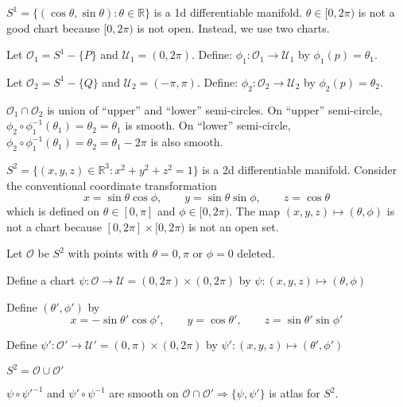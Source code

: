 \documentclass[a4paper,11pt]{article}
\DeclareMathOperator{\cpf}{\circ}
\begin{document}
	\begin{ex}
		$S^1 = \{(\cos \theta, \sin \theta): \theta \in \mathbb{R}\}$ is a 1d differentiable manifold. $\theta\in [0,2\pi)$ is not a good chart because $[0,2\pi)$ is not open. Instead, we use two charts. 
		
		Let $\mathcal{O}_1 = S^1 - \{P\}$ and $\mathcal{U}_1 = (0,2\pi)$. Define: $\phi_1: \mathcal{O}_1 \to \mathcal{U}_1$ by $\phi_1(p) = \theta_1$. 
		
		Let $\mathcal{O}_2 = S^1 - \{Q\}$ and $\mathcal{U}_2 = (-\pi,\pi)$. Define: $\phi_2: \mathcal{O}_2 \to \mathcal{U}_2$ by $\phi_2(p) = \theta_2$. 
		
		$\mathcal{O}_1 \cap \mathcal{O}_2$ is union of ``upper'' and ``lower'' semi-circles. On ``upper'' semi-circle, $\phi_2 \cpf \phi_1^{-1}(\theta_1) = \theta_2 = \theta_1$ is smooth. On ``lower'' semi-circle, $\phi_2 \cpf \phi_1^{-1}(\theta_1) = \theta_2 = \theta_1 - 2\pi$ is also smooth.
	\end{ex}

	\begin{ex}
		$S^2 = \{(x,y,z)\in \mathbb{R}^3 : x^2+y^2+z^2 = 1\}$ is a 2d differentiable manifold. Consider the conventional coordinate transformation $$x = \sin \theta \cos \phi,\qquad y = \sin \theta \sin \phi,\qquad z = \cos\theta$$ which is defined on $\theta \in [0,\pi]$ and $\phi \in [0,2\pi)$. The map $(x,y,z) \mapsto (\theta, \phi)$ is not a chart because $[0,2\pi]\times [0,2\pi)$ is not an open set.
		
		Let $\mathcal{O}$ be $S^2$ with points with $\theta = 0, \pi$ or $\phi = 0$ deleted.

		Define a chart $\psi: \mathcal{O} \to \mathcal{U} = (0,2\pi) \times (0,2\pi)$ by $\psi: (x,y,z) \mapsto (\theta,\phi)$
		
		Define $(\theta', \phi')$ by
		\[
			x = -\sin \theta' \cos \phi', \qquad y = \cos \theta', \qquad z = \sin\theta'\sin\phi' 
		\]

		Define $\psi' : \mathcal{O}' \to \mathcal{U}' = (0,\pi)\times (0,2\pi)$ by $\psi' : (x,y,z) \mapsto (\theta',\phi')$ 
		
		$S^2  = \mathcal{O} \cup \mathcal{O}'$

		$\psi \circ \psi'^{-1}$ and $\psi' \cpf \psi^{-1}$ are smooth on $\mathcal{O} \cap \mathcal{O}' \Rightarrow \{\psi,\psi'\}$ is atlas for $S^2$. 
	\end{ex}
\end{document}
